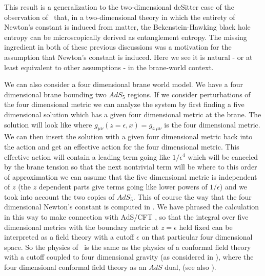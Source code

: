 This result is a generalization to the two-dimensional deSitter case of
the observation of \fpst\ that, in a two-dimensional theory in which the
entirety of Newton's constant is induced from matter, the
Bekenstein-Hawking black hole entropy can be microscopically derived as
entanglement entropy.  The missing ingredient in
both of these previous discussions was a motivation for the assumption
that Newton's constant is induced. Here we see it is
natural - or at least equivalent to other assumptions -
in the brane-world context.


We can also consider a four dimensional brane world model. 
We have a four dimensional brane bounding two $AdS_5$ regions. 
If we consider perturbations of the four dimensional metric we
can analyze the system by first finding a five dimensional solution
which has a given four dimensional metric at the brane. The solution
will look like
\eqn{}
where $g_{\mu\nu}(z=\epsilon,x) = g_{4~\mu\nu}$ is the four dimensional
metric. We can then insert the solution with a given four dimensional
metric back  into the action and get an effective action for the 
four dimensional metric. This effective action will contain a leading 
term going like $1/\epsilon^4$ which will be canceled by the brane
tension so that the next nontrivial term will be 
\eqn{}
where to this order of approximation we can assume that the five 
dimensional metric is independent of $z$ (the $z$ dependent parts give
terms going like lower powers of $1/\epsilon$) and we took  into 
account the two copies of $AdS_5$.    
This of course the way that the four dimensional Newton's constant is 
computed in \rs. 
We have phrased the calculation in this way to make connection with
AdS/CFT , so that the integral over five dimensional 
metrics with the boundary metric at $z=\epsilon$ held fixed 
can be interpreted 
as a field theory with a cutoff $\epsilon$ on that particular four 
dimensional space. So the physics of \rs\ is the same as the physics
of a conformal field theory with a cutoff coupled to four dimensional
gravity (as considered in \vf ), where the four dimensional conformal
field theory as an $AdS$ dual, (see also ).

